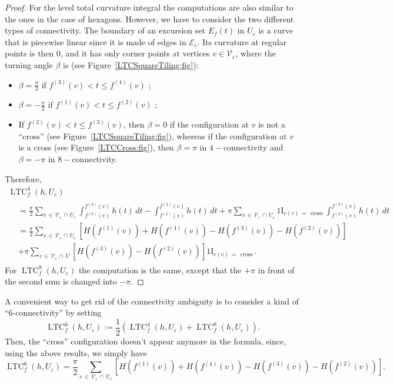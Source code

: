 \documentclass[10pt]{amsart}
\theoremstyle{definition}\newtheorem{defi}[theo]{Definition}\newtheorem{rema}[theo]{Remark}\newtheorem{exam}[theo]{Example}\newtheorem{exem}[theo]{Example}\newtheorem{nota}[theo]{Notation}
\newcommand{\ind}{{1\!\!\mathrm{I}}}
\newcommand{\eps}{\varepsilon}
\DeclareMathOperator{\LTC}{LTC}
\DeclareMathOperator{\cross}{cross}
\newcommand{\calV}{\mathcal{V}}
\newcommand{\calE}{\mathcal{E}}
\begin{document}
\begin{proof}
For the level total curvature integral the computations are also similar to the ones in the case of hexagons. However, we have to consider the two different types of connectivity. The boundary of an excursion set $E_f(t)$ in $U_\eps$ is a curve that is piecewise linear since it is made of edges in $\calE_\eps$. Its curvature at regular points is then $0$, and it has only corner points at vertices $v\in\calV_\eps$, where the turning angle $\beta$ is (see Figure~\ref{LTCSquareTiling:fig}):
\begin{itemize}
\item $\beta=\frac{\pi}{2}$ if $f^{(3)}(v)<t\leq f^{(4)}(v)$ ;
\item $\beta= - \frac{\pi}{2}$ if $f^{(1)}(v)<t\leq f^{(2)}(v)$ ;
\item If $f^{(2)}(v)<t\leq f^{(3)}(v)$, then $\beta=0$ if the configuration at $v$ is not a ``cross'' (see Figure~\ref{LTCSquareTiling:fig}), whereas if the configuration at $v$ is a cross (see Figure~\ref{LTCCross:fig}), then $\beta=\pi$ in $4-$connectivity and $\beta=-\pi$ in $8-$connectivity.
\end{itemize}



Therefore,
\begin{multline*}
\LTC^4_f(h,U_\eps)\\
\begin{aligned}
& = \frac{\pi}{2} \sum_{v\,\in\,\calV_\eps\,\cap\,U_\eps}
\int_{f^{(3)}(v)}^{f^{(4)}(v)} h(t) \, dt -\int_{f^{(1)}(v)}^{f^{(2)}(v)} h(t) \, dt + \pi
\sum_{v\,\in\,\calV_\eps\,\cap\,U_\eps} \ind_{c(v)\,=\,\cross}
\int_{f^{(2)}(v)}^{f^{(3)}(v)} h(t) \, dt \\
& =
\frac{\pi}{2} \sum_{v\,\in\,\calV_\varepsilon\,\cap\,U_\eps} \left[H\left(f^{(1)}(v)\right) + H\left(f^{(4)}(v)\right)- H\left(f^{(3)}(v)\right) - H\left(f^{(2)}(v)\right)\right] \\
& + \pi
\sum_{v\,\in\,\calV_\eps\,\cap\,U} \left[H\left(f^{(3)}(v)\right) - H\left(f^{(2)}(v)\right)\right]
\ind_{c(v)\,=\,\cross}.
\end{aligned}
\end{multline*}
For $\LTC^8_f(h,U_\eps)$ the computation is the same, except that the $+\pi$ in front of the second sum is changed into $-\pi$.
\end{proof}

A convenient way to get rid of the connectivity ambiguity is to consider a kind of ``6-connectivity'' by setting
\[
\LTC^6_f(h,U_\eps) := \frac{1}{2} \left(\LTC^4_f(h,U_\eps) +\LTC^8_f(h,U_\eps) \right).
\]
Then, the ``cross'' configuration doesn't appear anymore in the formula, since, using the above results, we simply have
\[
\LTC^6_f(h,U_\eps) = \frac{\pi}{2} \sum_{v\,\in\,\calV_\varepsilon\,\cap\,U_\eps} \left[H\left(f^{(1)}(v)\right) +
H\left(f^{(4)}(v)\right)- H\left(f^{(3)}(v)\right) - H\left(f^{(2)}(v)\right)\right].
\]
\end{document}
